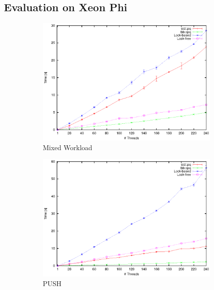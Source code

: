 \subsection{Evaluation on Xeon Phi}
\begin{figure}
	\centering
	\begin{subfigure}[b]{0.3\textwidth}
		\centering
		\includegraphics[width=\textwidth]{../plots/xp_mixed/runtime_mixed}
		\caption{Mixed Workload}
		\label{fig:xp_mixed}
	\end{subfigure}
	\hfill
	\begin{subfigure}[b]{0.3\textwidth}
		\centering
		\includegraphics[width=\textwidth]{../plots/xp_push/runtime_push}
		\caption{PUSH}
		\label{fig:xp_push}
	\end{subfigure}
	\hfill
	\begin{subfigure}[b]{0.3\textwidth}

\end{subfigure}
\end{figure}
